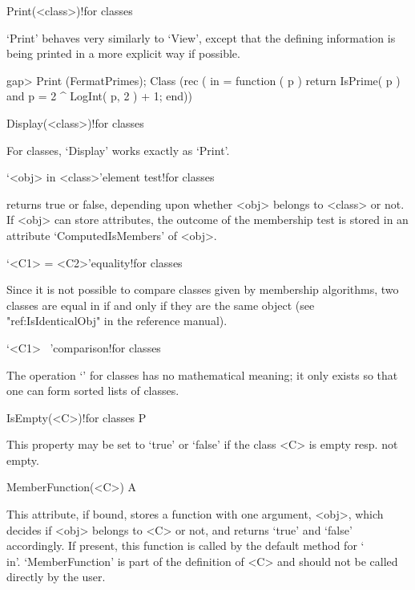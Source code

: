 \>Print(<class>)!{for classes}

`Print' behaves very similarly to `View', except that the defining
information is being printed in a more explicit way if possible.

\begintt
gap> Print (FermatPrimes);
Class (rec ( in = function ( p )
    return IsPrime( p ) and p = 2 ^ LogInt( p, 2 ) + 1;
end))
\endtt


\>Display(<class>)!{for classes}

For classes, `Display' works exactly as `Print'.

% 
%

\>`<obj> in <class>'{element test!for classes}

returns true or false, depending upon whether <obj> belongs to <class> or
not. If <obj> can store attributes, the outcome of the membership test is
stored in an attribute `ComputedIsMembers' of <obj>.

\>`<C1> = <C2>'{equality!for classes}

Since it is not possible to compare classes given by membership algorithms,
two classes are equal in {\GAP} if and only if they are the same {\GAP}
object (see "ref:IsIdenticalObj" in the {\GAP} reference manual).

\>`<C1> \<\ <C2>'{comparison!for classes}

The operation `\<' for classes has no mathematical meaning; it only exists
so that one can form sorted lists of classes.


\null


\>IsEmpty(<C>)!{for classes} P

This property may be set to `true' or `false' if the class <C> is empty
resp. not empty.

\>MemberFunction(<C>) A

This attribute, if bound, stores a function with one argument, <obj>,
which decides if <obj> belongs to <C> or not, and returns `true' and `false' accordingly.
If present, this function is called by the default method for `\\in'.
`MemberFunction' is part of the definition of <C> and should not be called 
directly by the user.



\null

